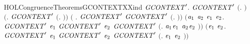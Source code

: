 \begin{SaveVerbatim}{HOLCongruenceTheoremsGCONTEXTXXind}
\HOLTokenTurnstile{} \HOLSymConst{\HOLTokenForall{}}\ensuremath{\HOLBoundVar{GCONTEXT}\sp{\prime}}.
       \ensuremath{\HOLBoundVar{GCONTEXT}\sp{\prime}} \ensuremath{(}\HOLTokenLambda{}. \ensuremath{)} \HOLSymConst{\HOLTokenConj{}} \ensuremath{(}\HOLSymConst{\HOLTokenForall{}}. \ensuremath{\HOLBoundVar{GCONTEXT}\sp{\prime}} \ensuremath{(}\HOLTokenLambda{}. \ensuremath{)}\ensuremath{)} \HOLSymConst{\HOLTokenConj{}}
       \ensuremath{(}\HOLSymConst{\HOLTokenForall{}} . \ensuremath{\HOLBoundVar{GCONTEXT}\sp{\prime}}  \HOLSymConst{\HOLTokenImp{}} \ensuremath{\HOLBoundVar{GCONTEXT}\sp{\prime}} \ensuremath{(}\HOLTokenLambda{}. \HOLSymConst{\ensuremath{\ldotp}} \ensuremath{)}\ensuremath{)} \HOLSymConst{\HOLTokenConj{}}
       \ensuremath{(}\HOLSymConst{\HOLTokenForall{}}\ensuremath{\HOLBoundVar{a}\sb{\mathrm{1}}} \ensuremath{\HOLBoundVar{a}\sb{\mathrm{2}}} \ensuremath{\HOLBoundVar{e}\sb{\mathrm{1}}} \ensuremath{\HOLBoundVar{e}\sb{\mathrm{2}}}.
            \ensuremath{\HOLBoundVar{GCONTEXT}\sp{\prime}} \ensuremath{\HOLBoundVar{e}\sb{\mathrm{1}}} \HOLSymConst{\HOLTokenConj{}} \ensuremath{\HOLBoundVar{GCONTEXT}\sp{\prime}} \ensuremath{\HOLBoundVar{e}\sb{\mathrm{2}}} \HOLSymConst{\HOLTokenImp{}}
            \ensuremath{\HOLBoundVar{GCONTEXT}\sp{\prime}} \ensuremath{(}\HOLTokenLambda{}. \ensuremath{\HOLBoundVar{a}\sb{\mathrm{1}}}\HOLSymConst{\ensuremath{\ldotp}}\ensuremath{\HOLBoundVar{e}\sb{\mathrm{1}}}  \HOLSymConst{\ensuremath{+}} \ensuremath{\HOLBoundVar{a}\sb{\mathrm{2}}}\HOLSymConst{\ensuremath{\ldotp}}\ensuremath{\HOLBoundVar{e}\sb{\mathrm{2}}} \ensuremath{)}\ensuremath{)} \HOLSymConst{\HOLTokenConj{}}
       \ensuremath{(}\HOLSymConst{\HOLTokenForall{}}\ensuremath{\HOLBoundVar{e}\sb{\mathrm{1}}} \ensuremath{\HOLBoundVar{e}\sb{\mathrm{2}}}.
            \ensuremath{\HOLBoundVar{GCONTEXT}\sp{\prime}} \ensuremath{\HOLBoundVar{e}\sb{\mathrm{1}}} \HOLSymConst{\HOLTokenConj{}} \ensuremath{\HOLBoundVar{GCONTEXT}\sp{\prime}} \ensuremath{\HOLBoundVar{e}\sb{\mathrm{2}}} \HOLSymConst{\HOLTokenImp{}}
            \ensuremath{\HOLBoundVar{GCONTEXT}\sp{\prime}} \ensuremath{(}\HOLTokenLambda{}. \ensuremath{\HOLBoundVar{e}\sb{\mathrm{1}}}  \HOLSymConst{\ensuremath{\mid}} \ensuremath{\HOLBoundVar{e}\sb{\mathrm{2}}} \ensuremath{)}\ensuremath{)} \HOLSymConst{\HOLTokenConj{}}

\end{SaveVerbatim}
